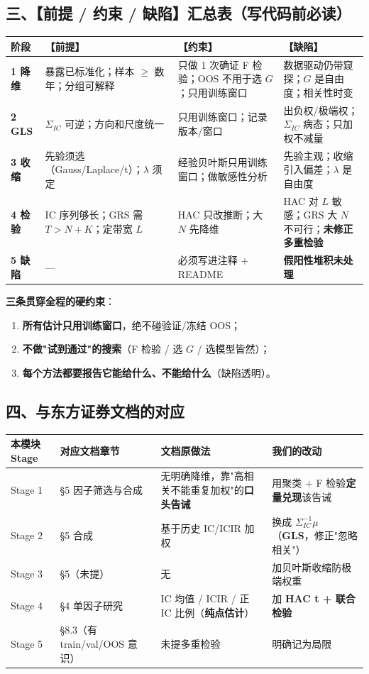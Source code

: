 \documentclass[11pt]{article}
\begin{document}
\subsection{\texorpdfstring{三、【前提 / 约束 / 缺陷】汇总表（写代码前必读）}{三、【前提 / 约束 / 缺陷】汇总表（写代码前必读）}}
{\small
\begin{longtable}{p{1.28cm}p{3.85cm}p{5.34cm}p{5.73cm}}
\toprule
阶段 & 【前提】 & 【约束】 & 【缺陷】 \\
\midrule
\textbf{1 降维} & 暴露已标准化；样本 \ensuremath{\ge} 数年；分组可解释 & 只做 1 次确证 F 检验；OOS 不用于选 $G$；只用训练窗口 & 数据驱动仍带窥探；$G$ 是自由度；相关性时变 \\
\textbf{2 GLS} & $\Sigma_{IC}$ 可逆；方向和尺度统一 & 只用训练窗口；记录版本/窗口 & 出负权/极端权；$\Sigma_{IC}$ 病态；只加权不减量 \\
\textbf{3 收缩} & 先验须选（Gauss/Laplace/t）；$\lambda$ 须定 & 经验贝叶斯只用训练窗口；做敏感性分析 & 先验主观；收缩引入偏差；$\lambda$ 是自由度 \\
\textbf{4 检验} & IC 序列够长；GRS 需 $T>N+K$；定带宽 $L$ & HAC 只改推断；大 $N$ 先降维 & HAC 对 $L$ 敏感；GRS 大 $N$ 不可行；\textbf{未修正多重检验} \\
\textbf{5 缺陷} & --- & 必须写进注释 + README & \textbf{假阳性堆积未处理} \\
\bottomrule
\end{longtable}
}
\textbf{三条贯穿全程的硬约束}：
\begin{enumerate}
  \item \textbf{所有估计只用训练窗口}，绝不碰验证/冻结 OOS；
  \item \textbf{不做"试到通过"的搜索}（F 检验 / 选 $G$ / 选模型皆然）；
  \item \textbf{每个方法都要报告它能给什么、不能给什么}（缺陷透明）。
\end{enumerate}
\subsection{\texorpdfstring{四、与东方证券文档的对应}{四、与东方证券文档的对应}}
{\small
\begin{longtable}{p{1.54cm}p{3.73cm}p{6.17cm}p{4.76cm}}
\toprule
本模块 Stage & 对应文档章节 & 文档原做法 & 我们的改动 \\
\midrule
Stage 1 & \S5 因子筛选与合成 & 无明确降维，靠"高相关不能重复加权"的\textbf{口头告诫} & 用聚类 + F 检验\textbf{定量兑现}该告诫 \\
Stage 2 & \S5 合成 & 基于历史 IC/ICIR 加权 & 换成 $\Sigma_{IC}^{-1}\mu$（\textbf{GLS}，修正"忽略相关"） \\
Stage 3 & \S5（未提） & 无 & 加贝叶斯收缩防极端权重 \\
Stage 4 & \S4 单因子研究 & IC 均值 / ICIR / 正 IC 比例（\textbf{纯点估计}） & 加 \textbf{HAC t + 联合检验} \\
Stage 5 & \S8.3（有 train/val/OOS 意识） & 未提多重检验 & 明确记为局限 \\
\bottomrule
\end{longtable}
}
\end{document}

